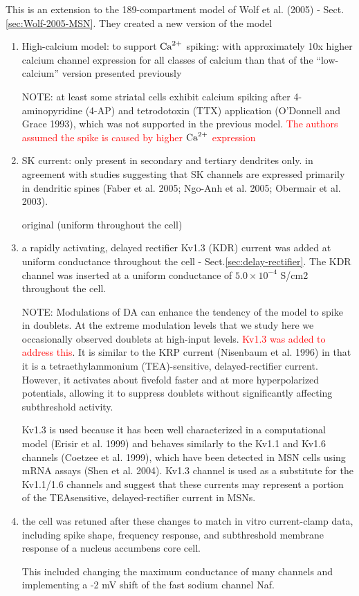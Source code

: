 This is an extension to the 189-compartment model of Wolf et al. (2005) -
Sect.\ref{sec:Wolf-2005-MSN}. They created a new version of the
model 
\begin{enumerate}
  \item High-calcium model: to support ${\text{Ca}^{2+}}$
spiking: with approximately 10x higher calcium channel expression
for all classes of calcium than that of the ``low-calcium'' version presented
previously

NOTE: at least some striatal cells exhibit calcium spiking after 4-aminopyridine
(4-AP) and tetrodotoxin (TTX) application (O'Donnell and Grace 1993), which
was not supported in the previous model. \textcolor{red}{The authors assumed
the spike is caused by higher ${\text{Ca}^{2+}}$ expression}


  \item SK current: only present in secondary and tertiary dendrites only.
  in agreement with studies suggesting that SK channels are expressed
primarily in dendritic spines (Faber et al. 2005; Ngo-Anh et al. 2005;
Obermair et al. 2003).

  
  original (uniform throughout the cell) 
  
  \item a rapidly activating, delayed rectifier
Kv1.3 (KDR) current was added at uniform conductance throughout the cell -
Sect.\ref{sec:delay-rectifier}. The KDR channel was inserted at a uniform
conductance of $5.0 \times 10^{-4}$ S/cm2 throughout the cell.

NOTE: Modulations of DA can enhance the tendency of the model to spike in
doublets. At the extreme modulation levels that we study here
we occasionally observed doublets at high-input levels. 
\textcolor{red}{Kv1.3 was added to address this}.
It is similar
to the KRP current (Nisenbaum et al. 1996) in that it is a
tetraethylammonium (TEA)-sensitive, delayed-rectifier current.
However, it activates about fivefold faster and at more hyperpolarized
potentials, allowing it to suppress doublets without significantly
affecting subthreshold activity.

Kv1.3 is used because it has been well characterized in a computational model
(Erisir et al. 1999) and behaves similarly to the Kv1.1 and Kv1.6 channels
(Coetzee et al. 1999), which have been detected in MSN cells using mRNA assays
(Shen et al. 2004).
Kv1.3 channel is used as a substitute for the Kv1.1/1.6 channels and suggest
that these currents may represent a portion of the TEAsensitive,
delayed-rectifier current in MSNs.
  
  \item the cell was retuned after these changes to match in
vitro current-clamp data, including spike shape, frequency response, and
subthreshold membrane response of a nucleus accumbens core cell.

This included changing the maximum conductance of many channels and implementing
a -2 mV shift of the fast sodium channel Naf.

\end{enumerate}

